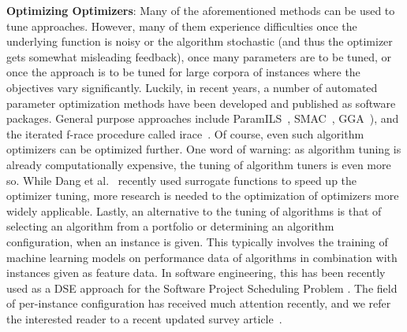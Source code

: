 \documentclass[sigconf,anonymous,review]{acmart}
\begin{document}
\noindent\textbf{Optimizing Optimizers}: %
Many of the aforementioned methods can be used to tune approaches. However, many of them experience difficulties once the underlying function is noisy or the algorithm stochastic (and thus the optimizer gets somewhat misleading feedback), once many parameters are to be tuned, or once the approach is to be tuned for large corpora of instances where the objectives vary significantly. Luckily, in recent years, a number of automated parameter optimization methods have been developed and published as software packages. General purpose approaches include ParamILS~\cite{hutter2007paramils}, SMAC~\cite{hutter2011smac}, GGA~\cite{ansotegui2009gga}), and the iterated f-race procedure called irace~\cite{birattari2002irace}. %
Of course, even such algorithm optimizers can be optimized further. One word of warning: as algorithm tuning is already computationally expensive, the tuning of algorithm tuners is even more so. While Dang et al.~\cite{dang2017iraceconfig} recently used surrogate functions to speed up the optimizer tuning, more research is needed to the optimization of optimizers more widely applicable. Lastly, an alternative to the tuning of algorithms is that of selecting an algorithm from a portfolio or determining an algorithm configuration, when an instance is given. This typically involves the training of machine learning models on performance data of algorithms in combination with instances given as feature data. {In software engineering, this has been recently used as a DSE approach for the Software Project Scheduling Problem \cite{Shen2018,wu2016}.} The field of per-instance configuration has received much attention recently, and we refer the interested reader to a recent updated survey article~\cite{kotthoff2016survey}. 
\end{document}
